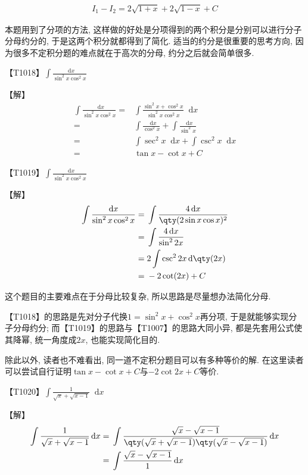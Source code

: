 \documentclass{ctexbook}
\newcommand*{\dif}{\mathop{}\!\mathrm{d}}
\begin{document}
{\begin{align*}
I_{1}-I_{2}=2\sqrt{1+x}+2\sqrt{1-x}+C
\end{align*}\par
{\kaishu 本题用到了分项的方法, 这样做的好处是分项得到的两个积分是分别可以进行分子分母约分的, 于是这两个积分就都得到了简化. 适当的约分是很重要的思考方向, 因为很多不定积分题的难点就在于高次的分母, 约分之后就会简单很多. \par}
{\color{red}【T1018】}$\int\frac{\dif{x}}{\sin^{2}{x}\cos^{2}{x}}$\par
【解】
\begin{align*}
\int\frac{\dif{x}}{\sin^{2}{x}\cos^{2}{x}}={}&\int\frac{\sin^{2}{x}+\cos^{2}{x}}{\sin^{2}{x}\cos^{2}{x}}\dif{x}\\
={}&\int\frac{\dif{x}}{\cos^{2}{x}}+\int\frac{\dif{x}}{\sin^{2}{x}}\\
={}&\int\sec^{2}{x}\dif{x}+\int\csc^{2}{x}\dif{x}\\
={}&\tan{x}-\cot{x}+C
\end{align*}\par
{\color{red}【T1019】}$\int\frac{\dif{x}}{\sin^{2}{x}\cos^{2}{x}}$\par
【解】
\begin{align*}
\int\frac{\dif{x}}{\sin^{2}{x}\cos^{2}{x}}={}&\int\frac{4\dif{x}}{\qty(2\sin{x}\cos{x})^{2}}\\
={}&\int\frac{4\dif{x}}{\sin^{2}{2x}}\\
={}&2\int\csc^{2}{2x}\dif{\qty(2x)}\\
={}&-2\cot(2x)+C
\end{align*}\par
{\kaishu 这个题目的主要难点在于分母比较复杂, 所以思路是尽量想办法简化分母. \par
{\color{red}【T1018】}的思路是先对分子代换$1=\sin^{2}{x}+\cos^{2}{x}$再分项, 于是就能够实现分子分母约分; 而{\color{red}【T1019】}的思路与{\color{red}【T1007】}的思路大同小异, 都是先套用公式使其降幂, 统一角度成$2x$, 也能实现简化目的. \par
除此以外, 读者也不难看出, 同一道不定积分题目可以有多种等价的解. 在这里读者可以尝试自行证明$\tan{x}-\cot{x}+C$与$-2\cot{2x}+C$等价. \par}
{\color{red}【T1020】}$\int\frac{1}{\sqrt{x}+\sqrt{x-1}}\dif{x}$\par
【解】
\begin{align*}
\int\frac{1}{\sqrt{x}+\sqrt{x-1}}\dif{x}={}&\int\frac{\sqrt{x}-\sqrt{x-1}}{\qty(\sqrt{x}+\sqrt{x-1})\qty(\sqrt{x}-\sqrt{x-1})}\dif{x}\\
={}&\int\frac{\sqrt{x}-\sqrt{x-1}}{1}\dif{x}\\

\end{align*}}
\end{document}
